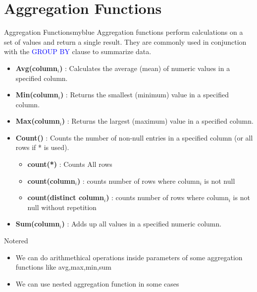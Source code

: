 \vspace{0.35cm}
\section{Aggregation Functions}
 \begin{prettyBox}{Aggregation Functions}{myblue}
   Aggregation functions perform calculations on a set of values and return a single result. They are commonly used in conjunction with the \textcolor{blue}{GROUP BY} clause to summarize data.
   \begin{itemize}
    \item \textbf{Avg(column$_{i}$)} : Calculates the average (mean) of numeric values in a specified column.
    \item \textbf{Min(column$_{i}$)} : Returns the smallest (minimum) value in a specified column.
    \item \textbf{Max(column$_{i}$)} : Returns the largest (maximum) value in a specified column.
    \item \textbf{Count()} : Counts the number of non-null entries in a specified column (or all rows if * is used).
      \begin{itemize}
        \item  \textbf{count(*)} : Counts All rows
        \item  \textbf{count(column$_{i}$)} : counts number of rows where column$_{i}$ is not null
        \item  \textbf{count(distinct column$_{i}$)} : counts number of rows where column$_{i}$ is not null without repetition
    \end{itemize}
    \item \textbf{Sum(column$_{i}$)} : Adds up all values in a specified numeric column.
   \end{itemize} 
\end{prettyBox}

\vspace{0.25cm}

\begin{prettyBox}{Note}{red}
\begin{itemize}
    \item We can do arithmethical operations inside parameters of some aggregation functions like avg,max,min,sum 
    \item We can use nested aggregation function in some cases 
\end{itemize}
\end{prettyBox}

